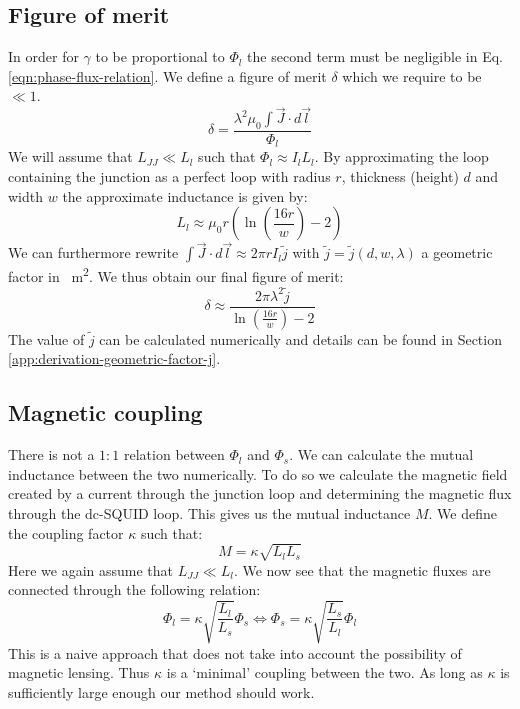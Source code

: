 \subsection{Figure of merit}
In order for $\gamma$ to be proportional to $\Phi_l$ the second term must be negligible in Eq. \ref{eqn:phase-flux-relation}. We define a figure of merit $\delta$ which we require to be $\ll 1$.
\begin{equation}
	\delta = \frac{\lambda^2\mu_0 \int \vec{J}\cdot d \vec{l}}{\Phi_l}
\end{equation}
We will assume that $L_{JJ} \ll L_l$ such that $\Phi_l \approx I_lL_l$. By approximating the loop containing the junction as a perfect loop with radius $r$, thickness (height) $d$ and width $w$ the approximate inductance is given by\cite{eewebCoilInductanceCalculator}:
\begin{equation}
	L_l \approx \mu_0 r \left( \ln\left(\frac{16r}{w}\right) - 2\right)
	\label{eq:loop-inductance}
\end{equation}
We can furthermore rewrite $\int \vec{J} \cdot d \vec{l} \approx 2\pi r I_l \tilde{j}$ with $\tilde{j} = \tilde{j}(d, w, \lambda)$ a geometric factor in \unit{\per\square\meter}. We thus obtain our final figure of merit:
\begin{equation}
	\delta \approx \frac{2\pi \lambda^2 \tilde{j}}{\ln\left(\frac{16r}{w}\right) - 2}
	\label{eqn:figure-of-merit}
\end{equation}
The value of $\tilde{j}$ can be calculated numerically and details can be found in Section \ref{app:derivation-geometric-factor-j}.

\subsection{Magnetic coupling}
There is not a $1:1$ relation between $\Phi_l$ and $\Phi_s$. We can calculate the mutual inductance between the two numerically. To do so we calculate the magnetic field created by a current through the junction loop and determining the magnetic flux through the dc-SQUID loop. This gives us the mutual inductance $M$. We define the coupling factor $\kappa$ such that:
\begin{equation}
	M = \kappa \sqrt{L_lL_s}
\end{equation}
Here we again assume that $L_{JJ} \ll L_l$. We now see that the magnetic fluxes are connected through the following relation:
\begin{equation}
	\Phi_l = \kappa \sqrt{\frac{L_l}{L_s}}\Phi_s \Leftrightarrow \Phi_s = \kappa \sqrt{\frac{L_s}{L_l}}\Phi_l
\end{equation}
This is a naive approach that does not take into account the possibility of magnetic lensing\cite{prigozhin3DSimulationSuperconducting2018}. Thus $\kappa$ is a `minimal' coupling between the two. As long as $\kappa$ is sufficiently large enough our method should work.

